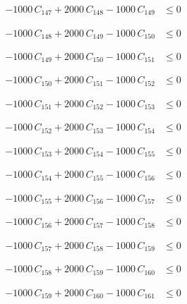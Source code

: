 \documentclass[a4paper,11pt]{article}
\begin{document}
\begin{align}
-1000\,C_{147} + 2000\,C_{148} - 1000\,C_{149} &\leq 0 \nonumber
\end{align}

\begin{align}
-1000\,C_{148} + 2000\,C_{149} - 1000\,C_{150} &\leq 0 \nonumber
\end{align}

\begin{align}
-1000\,C_{149} + 2000\,C_{150} - 1000\,C_{151} &\leq 0 \nonumber
\end{align}

\begin{align}
-1000\,C_{150} + 2000\,C_{151} - 1000\,C_{152} &\leq 0 \nonumber
\end{align}

\begin{align}
-1000\,C_{151} + 2000\,C_{152} - 1000\,C_{153} &\leq 0 \nonumber
\end{align}

\begin{align}
-1000\,C_{152} + 2000\,C_{153} - 1000\,C_{154} &\leq 0 \nonumber
\end{align}

\begin{align}
-1000\,C_{153} + 2000\,C_{154} - 1000\,C_{155} &\leq 0 \nonumber
\end{align}

\begin{align}
-1000\,C_{154} + 2000\,C_{155} - 1000\,C_{156} &\leq 0 \nonumber
\end{align}

\begin{align}
-1000\,C_{155} + 2000\,C_{156} - 1000\,C_{157} &\leq 0 \nonumber
\end{align}

\begin{align}
-1000\,C_{156} + 2000\,C_{157} - 1000\,C_{158} &\leq 0 \nonumber
\end{align}

\begin{align}
-1000\,C_{157} + 2000\,C_{158} - 1000\,C_{159} &\leq 0 \nonumber
\end{align}

\begin{align}
-1000\,C_{158} + 2000\,C_{159} - 1000\,C_{160} &\leq 0 \nonumber
\end{align}

\begin{align}
-1000\,C_{159} + 2000\,C_{160} - 1000\,C_{161} &\leq 0 \nonumber
\end{align}
\end{document}
